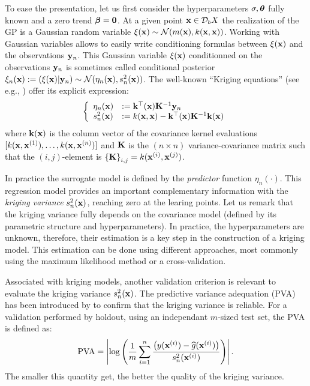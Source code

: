 To ease the presentation, let us first consider the hyperparameters $\sigma, {\boldsymbol{\theta}}$ fully known and a zero trend ${\boldsymbol{\beta}} = \textbf{0}$.
At a given point ${\bf x} \in \mathcal{D}_bX$ the realization of the GP is a Gaussian random variable $\xi({\bf x}) \sim \mathcal{N}(m({\bf x}), k({\bf x}, {\bf x}))$. 
Working with Gaussian variables allows to easily write conditioning formulas between $\xi({\bf x})$ and the observations ${\bf y}_n$.
This Gaussian variable $\xi({\bf x})$ conditionned on the observations ${\bf y}_n$ is sometimes called conditional posterior $\xi_n({\bf x}) := (\xi({\bf x}) | {\bf y}_n) \sim \mathcal{N}(\eta_n({\bf x}), s_n^2({\bf x}))$. 
The well-known ``Kriging equations'' (see e.g., \cite{rasmussen_2006}) offer its explicit expression:
\begin{equation}
    \left\{
    \begin{array}{ll}
        \eta_n({\bf x}) &:= {\bf k}^\top({\bf x}) {\bf K}^{-1} {\bf y}_n\\
        s_n^2({\bf x}) &:= k({\bf x}, {\bf x}) - {\bf k}^\top({\bf x}) {\bf K}^{-1} {\bf k}({\bf x})
    \end{array}
\right.
\label{eq:kriging}
\end{equation}
where ${\bf k}({\bf x})$ is the column vector of the covariance kernel evaluations $[k({\bf x}, {\bf x}^{(1)}), \dots,\allowbreak k({\bf x}, {\bf x}^{(n)})]$ and ${\bf K}$ is the $(n \times n)$ 
variance-covariance matrix such that the $(i, j)$-element is $\left\{{\bf K} \right\}_{i, j}=k({\bf x}^{(i)}, {\bf x}^{(j)})$.

In practice the surrogate model is defined by the \textit{predictor} function $\eta_n(\cdot)$. 
This regression model provides an important complementary information with the \textit{kriging variance} $s_n^2({\bf x})$, reaching zero at the learing points.
Let us remark that the kriging variance fully depends on the covariance model (defined by its parametric structure and hyperparameters). 
In practice, the hyperparameters are unknown, therefore, their estimation is a key step in the construction of a kriging model. 
This estimation can be done using different approaches, most commonly using the maximum likelihood method or a cross-validation.

Associated with kriging models, another validation criterion is relevant to evaluate the kriging variance $s_n^2({\bf x})$. 
The predictive variance adequation (PVA) has been introduced by \citet{bachoc_2013} to confirm that the kriging variance is reliable.
For a validation performed by holdout, using an independant $m$-sized test set, the PVA is defined as: 
\begin{equation}
    \mathrm{PVA} = \left| \log\left( \frac1m \sum_{i=1}^{n} \frac{\left(y({\bf x}^{(i)}) - \widehat{g}({\bf x}^{(i)})\right)}{s_n^2({\bf x}^{(i)})}\right) \right|.
\end{equation}
The smaller this quantity get, the better the quality of the kriging variance. 

